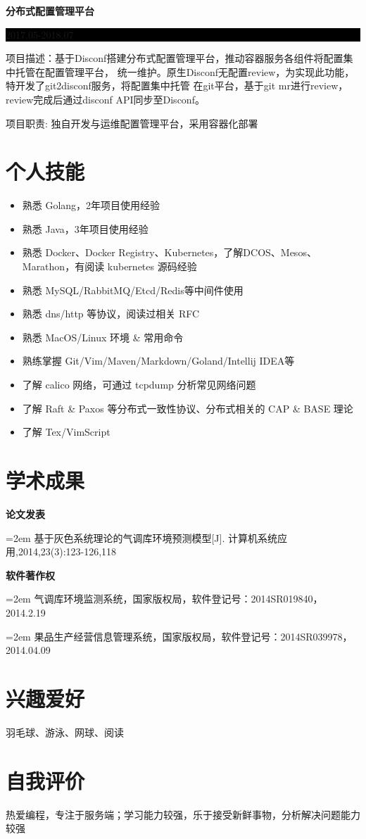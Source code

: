 \documentclass[paper=a4,fontsize=11pt]{scrartcl} %
\newcommand{\sepspace}{\vspace*{1em}}		%
\newcommand{\Section}[1]{\section*{ #1 }}          %
\newcommand{\SubSection}[2]{
	\sepspace \noindent \textbf{#1} \hfill      %
	\colorbox{Black}{\parbox{7em}{\hfill\color{White}#2}} \par  %
	\normalsize \par \sepspace}
\newcommand{\Academic}[2]{
		\noindent \textbf{#1} \par      %
		\hangindent=2em \small #2 %
		\normalsize \par}
\begin{document}
\begin{CJK}{UTF8}{gbsn}
\SubSection{分布式配置管理平台}{2017.05-2018.07}
项目描述：基于Disconf搭建分布式配置管理平台，推动容器服务各组件将配置集中托管在配置管理平台，
统一维护。原生Disconf无配置review，为实现此功能，特开发了git2disconf服务，将配置集中托管
在git平台，基于git mr进行review，review完成后通过disconf API同步至Disconf。\par
\sepspace
项目职责: 独自开发与运维配置管理平台，采用容器化部署

\Section{个人技能}

\begin{itemize}
	\item 熟悉 Golang，2年项目使用经验
	\item 熟悉 Java，3年项目使用经验
	\item 熟悉 Docker、Docker Registry、Kubernetes，了解DCOS、Mesos、Marathon，有阅读 kubernetes 源码经验
	\item 熟悉 MySQL/RabbitMQ/Etcd/Redis等中间件使用
	\item 熟悉 dns/http 等协议，阅读过相关 RFC
	\item 熟悉 MacOS/Linux 环境 \& 常用命令
	\item 熟练掌握 Git/Vim/Maven/Markdown/Goland/Intellij IDEA等
	\item 了解 calico 网络，可通过 tcpdump 分析常见网络问题
	\item 了解 Raft \& Paxos 等分布式一致性协议、分布式相关的 CAP \& BASE 理论
	\item 了解 Tex/VimScript
\end{itemize}

\Section{学术成果}

\Academic{论文发表}{基于灰色系统理论的气调库环境预测模型[J]. 计算机系统应用,2014,23(3):123-126,118}
\sepspace

\Academic{软件著作权}{气调库环境监测系统，国家版权局，软件登记号：2014SR019840，2014.2.19}
\Academic{}{果品生产经营信息管理系统，国家版权局，软件登记号：2014SR039978，2014.04.09}
\sepspace

\Section{兴趣爱好}
羽毛球、游泳、网球、阅读

\Section{自我评价}
热爱编程，专注于服务端；学习能力较强，乐于接受新鲜事物，分析解决问题能力较强
\end{CJK}     %
\end{document}
